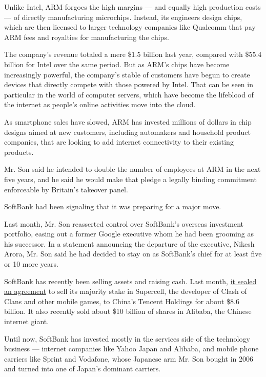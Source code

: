 Unlike Intel, ARM forgoes the high margins --- and equally high
production costs --- of directly manufacturing microchips. Instead, its
engineers design chips, which are then licensed to larger technology
companies like Qualcomm that pay ARM fees and royalties for
manufacturing the chips.

The company's revenue totaled a mere \$1.5 billion last year, compared
with \$55.4 billion for Intel over the same period. But as ARM's chips
have become increasingly powerful, the company's stable of customers
have begun to create devices that directly compete with those powered by
Intel. That can be seen in particular in the world of computer servers,
which have become the lifeblood of the internet as people's online
activities move into the cloud.

As smartphone sales have slowed, ARM has invested millions of dollars in
chip designs aimed at new customers, including automakers and household
product companies, that are looking to add internet connectivity to
their existing products.

Mr. Son said he intended to double the number of employees at ARM in the
next five years, and he said he would make that pledge a legally binding
commitment enforceable by Britain's takeover panel.

SoftBank had been signaling that it was preparing for a major move.

Last month, Mr. Son reasserted control over SoftBank's overseas
investment portfolio, easing out a former Google executive whom he had
been grooming as his successor. In a statement announcing the departure
of the executive, Nikesh Arora, Mr. Son said he had decided to stay on
as SoftBank's chief for at least five or 10 more years.

SoftBank has recently been selling assets and raising cash. Last month,
\href{http://www.nytimes.com/2016/06/22/business/dealbook/tencent-softcell-softbank-deal.html}{it
sealed an agreement} to sell its majority stake in Supercell, the
developer of Clash of Clans and other mobile games, to China's Tencent
Holdings for about \$8.6 billion. It also recently sold about \$10
billion of shares in Alibaba, the Chinese internet giant.

Until now, SoftBank has invested mostly in the services side of the
technology business --- internet companies like Yahoo Japan and Alibaba,
and mobile phone carriers like Sprint and Vodafone, whose Japanese arm
Mr. Son bought in 2006 and turned into one of Japan's dominant carriers.


